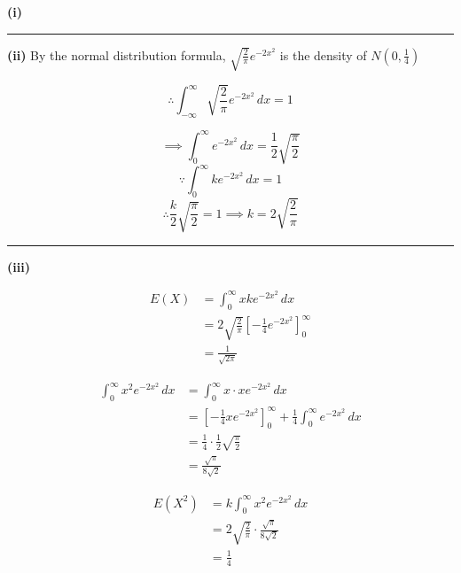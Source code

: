 \documentclass[12pt]{article}
\begin{document}
\newcommand{\ds}{\displaystyle}

\textbf{(i)}

\begin{center}
\end{center}

\bigskip\hrule\bigskip

\textbf{(ii)}
By the normal distribution formula, $\ds \sqrt{\frac2\pi}e^{-2x^2}$ is the density of $\ds N\left(0,\frac14\right)$

$$\therefore \int_{-\infty}^{\infty}\sqrt{\frac2\pi}e^{-2x^2}\,dx=1$$

$$\implies \int_0^\infty e^{-2x^2}\,dx=\frac12\sqrt{\frac{\pi}{2}}$$
$$\because \int_0^\infty ke^{-2x^2}\,dx=1$$
$$\therefore \frac{k}{2}\sqrt{\frac{\pi}{2}}=1\implies k=2\sqrt{\frac2\pi}$$
\bigskip\hrule\bigskip

\textbf{(iii)}

\begin{align*}
E(X)
&=\int_0^\infty xke^{-2x^2}\,dx\\
&=2\sqrt{\frac2\pi} \left[-\frac14e^{-2x^2}\right]_0^\infty\\
&=\frac1{\sqrt{2\pi}}
\end{align*}

\begin{align*}
\int_0^\infty x^2e^{-2x^2}\,dx
&=\int_0^\infty x\cdot xe^{-2x^2}\,dx\\
&=\left[-\frac14xe^{-2x^2}\right]_0^\infty+\frac14\int_0^\infty e^{-2x^2}\,dx\\
&=\frac14\cdot \frac12\sqrt{\frac{\pi}{2}}\\
&=\frac{\sqrt\pi}{8\sqrt2}
\end{align*}

\begin{align*}
E(X^2)
&=k\int_0^\infty x^2e^{-2x^2}\,dx\\
&=2\sqrt{\frac2\pi}\cdot \frac{\sqrt\pi}{8\sqrt2}\\
&=\frac14
\end{align*}
\end{document}
